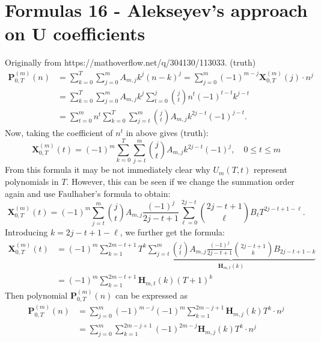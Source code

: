 \documentclass[12pt, letterpaper]{amsart}
\theoremstyle{definition}
\theoremstyle{remark}
\numberwithin{equation}{section}
\begin{document}
\section{Formulas 16 - Alekseyev's approach on U coefficients}
Originally from https://mathoverflow.net/q/304130/113033. (truth)
\begin{equation*}
\begin{split}
\mathbf{P}^{(m)}_{0,T}(n)
&=\sum_{k=0}^T\sum_{j=0}^m A_{m,j}k^j(n-k)^j = \sum_{j=0}^m(-1)^{m-j}\mathbf{X}^{(m)}_{0,T}(j)\cdot n^j \\
&=\sum_{k=0}^T\sum_{j=0}^m A_{m,j}k^j\sum_{t=0}^j\binom{j}{t}n^t(-1)^{t-t}k^{j-t}\\
&=\sum_{t=0}^m n^t \sum_{k=0}^T\sum_{j=t}^m \binom{j}{t}A_{m,j}k^{2j-t}(-1)^{j-t}.
\end{split}
\end{equation*}
Now, taking the coefficient of $n^t$ in above gives (truth):
\begin{equation*}
\mathbf{X}^{(m)}_{0,T}(t) =(-1)^m \sum_{k=0}^T\sum_{j=t}^m \binom{j}{t}A_{m,j}k^{2j-t}(-1)^j, \quad 0\leq t \leq m
\end{equation*}
From this formula it may be not immediately clear why $U_m(T,t)$ represent polynomials in $T$. However, this can be seen if we change the summation order again and use Faulhaber's formula to obtain:
\begin{equation*}
\mathbf{X}^{(m)}_{0,T}(t) = (-1)^m \sum_{j=t}^m \binom{j}{t}A_{m,j} \frac{(-1)^j}{2j-t+1}\sum_{\ell=0}^{2j-t} \binom{2j-t+1}{\ell}B_{\ell}T^{2j-t+1-\ell}.
\end{equation*}
Introducing $k=2j-t+1-\ell$, we further get the formula:
\begin{equation*}
\begin{split}
\mathbf{X}^{(m)}_{0,T}(t)
&=(-1)^m \sum_{k=1}^{2m-t+1} T^k \underbrace{\sum_{j=t}^m \binom{j}{t}A_{m,j} \frac{(-1)^j}{2j-t+1}\binom{2j-t+1}{k}B_{2j-t+1-k}}_{\mathbf{H}_{m,t}(k)}\\
&=(-1)^m \sum_{k=1}^{2m-t+1} \mathbf{H}_{m,t}(k) (T+1)^k
\end{split}
\end{equation*}
Then polynomial $\mathbf{P}^{(m)}_{0,T}(n)$ can be expressed as
\begin{equation*}
\begin{split}
\mathbf{P}^{(m)}_{0,T}(n)
&=\sum_{j=0}^m(-1)^{m-j}(-1)^m \sum_{k=1}^{2m-j+1} \mathbf{H}_{m,j}(k) T^k\cdot n^j \\
&=\sum_{j=0}^m\sum_{k=1}^{2m-j+1} (-1)^{2m-j} \mathbf{H}_{m,j}(k) T^k\cdot n^j
\end{split}
\end{equation*}
\end{document}
